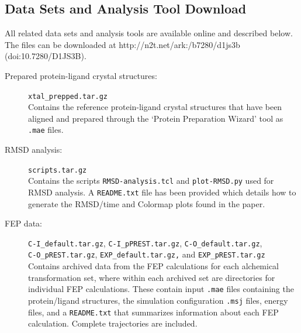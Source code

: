 \clearpage
\subsection*{Data Sets and Analysis Tool Download}
All related data sets and analysis tools are available online and described below.
The files can be downloaded at http://n2t.net/ark:/b7280/d1js3b (doi:10.7280/D1JS3B). 
\begin{description}
\item [Prepared protein-ligand crystal structures:]\texttt{xtal\_prepped.tar.gz}\\
Contains the reference protein-ligand crystal structures that have been aligned and prepared through the `Protein Preparation Wizard' tool as \texttt{.mae} files.
\item [RMSD analysis:]\texttt{scripts.tar.gz}\\
Contains the scripts \texttt{RMSD-analysis.tcl} and \texttt{plot-RMSD.py} used for RMSD analysis. A \texttt{README.txt} file has been provided which details how to generate the RMSD/time and Colormap plots found in the paper. 
\item [FEP data:]\texttt{C-I\_default.tar.gz}, \texttt{C-I\_pPREST.tar.gz}, \texttt{C-O\_default.tar.gz}, \\ \texttt{C-O\_pREST.tar.gz}, \texttt{EXP\_default.tar.gz,} and \texttt{EXP\_pREST.tar.gz}\\
Contains archived data from the FEP calculations for each alchemical transformation set, where within each archived set are directories for individual FEP calculations. These contain input \texttt{.mae} files containing the protein/ligand structures, the simulation configuration \texttt{.msj} files, energy files, and a \texttt{README.txt} that summarizes information about each FEP calculation. Complete trajectories are included.
\end{description}

